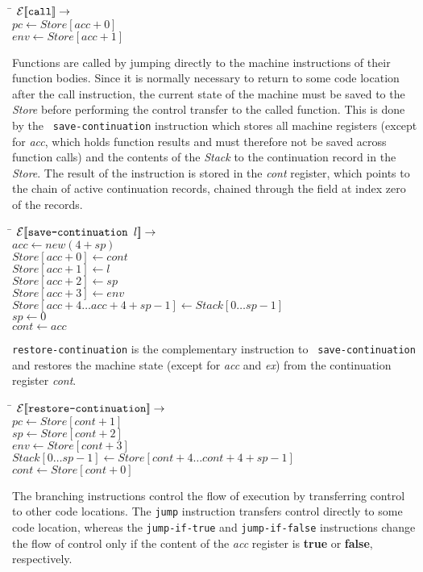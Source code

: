 \begin{tabbing}
\qquad \= \quad \kill
${\mathcal{E}{\normalfont [\![} \text{{\tt call}} {\normalfont ]\!]}} \rightarrow$\\
\>$pc \leftarrow Store[acc+0]$\\
\>$env \leftarrow Store[acc+1]$
\end{tabbing}
%
Functions are called by jumping directly to the machine instructions
of their function bodies.  Since it is normally necessary to return to
some code location after the call instruction, the current state of
the machine must be saved to the {\em Store} before performing the
control transfer to the called function.  This is done by the {\tt
  save-continuation} instruction which stores all machine registers
(except for {\em acc}, which holds function results and must therefore
not be saved across function calls) and the contents of the {\em
  Stack} to the continuation record in the {\em Store}.  The result of
the instruction is stored in the {\em cont} register, which points to
the chain of active continuation records, chained through the field at
index zero of the records.

\begin{tabbing}
\qquad \= \quad \kill
${\mathcal{E}{\normalfont [\![} \text{{\tt save-continuation }} l {\normalfont ]\!]}} \rightarrow$\\
\>$acc \leftarrow new(4+sp)$\\
\>$Store[acc+0] \leftarrow cont$\\
\>$Store[acc+1] \leftarrow l$\\
\>$Store[acc+2] \leftarrow sp$\\
\>$Store[acc+3] \leftarrow env$\\
\>$Store[acc+4\dots acc+4+sp-1] \leftarrow Stack[0\dots sp-1]$\\
\>$sp \leftarrow 0$\\
\>$cont \leftarrow acc$
\end{tabbing}
%
{\tt restore-continuation} is the complementary instruction to {\tt
  save-continuation} and restores the machine state (except for {\em
  acc} and {\em ex}) from the continuation register {\em cont}.

\begin{tabbing}
\qquad \= \quad \kill
${\mathcal{E}{\normalfont [\![} \text{{\tt restore-continuation}} {\normalfont ]\!]}} \rightarrow$\\
\>$pc \leftarrow Store[cont+1]$\\
\>$sp \leftarrow Store[cont+2]$\\
\>$env \leftarrow Store[cont+3]$\\
\>$Stack[0\dots sp-1] \leftarrow Store[cont+4\dots cont+4+sp-1]$\\
\>$cont \leftarrow Store[cont+0]$
\end{tabbing}
%
The branching instructions control the flow of execution by
transferring control to other code locations.  The {\tt jump}
instruction transfers control directly to some code location, whereas
the {\tt jump-if-true} and {\tt jump-if-false} instructions change the
flow of control only if the content of the {\em acc} register is {\bf
  true} or {\bf false}, respectively.

